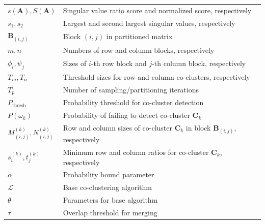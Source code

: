 \documentclass[journal]{IEEEtran}
\theoremstyle{definition}
\theoremstyle{remark} %
\begin{document}
\begin{table}[htbp]
\begin{tabular}{@{} p{} p{} @{}}
        $s(\mathbf{A}), S(\mathbf{A})$     & Singular value ratio score and normalized score, respectively                                 \\
        $s_1, s_2$                         & Largest and second largest singular values, respectively                                      \\
        $\mathbf{B}_{(i,j)}$               & Block $(i,j)$ in partitioned matrix                                                           \\
        $m, n$                             & Numbers of row and column blocks, respectively                                                \\
        $\phi_i, \psi_j$                   & Sizes of $i$-th row block and $j$-th column block, respectively                               \\
        $T_m, T_n$                         & Threshold sizes for row and column co-clusters, respectively                                  \\
        $T_p$                              & Number of sampling/partitioning iterations                                                    \\
        $P_{\text{thresh}}$                & Probability threshold for co-cluster detection                                                \\
        $P(\omega_k)$                      & Probability of failing to detect co-cluster $\mathbf{C}_k$                                    \\
        $M_{(i,j)}^{(k)}, N_{(i,j)}^{(k)}$ & Row and column sizes of co-cluster $\mathbf{C}_k$ in block $\mathbf{B}_{(i,j)}$, respectively \\
        $s_i^{(k)}, t_j^{(k)}$             & Minimum row and column ratios for co-cluster $\mathbf{C}_k$, respectively                     \\
        $\alpha$                           & Probability bound parameter                                                                   \\
        $\mathcal{L}$                      & Base co-clustering algorithm                                                                  \\
        $\theta$                           & Parameters for base algorithm                                                                 \\
        $\tau$                             & Overlap threshold for merging                                                                 \\

\end{tabular}
\end{table}
\end{document}
